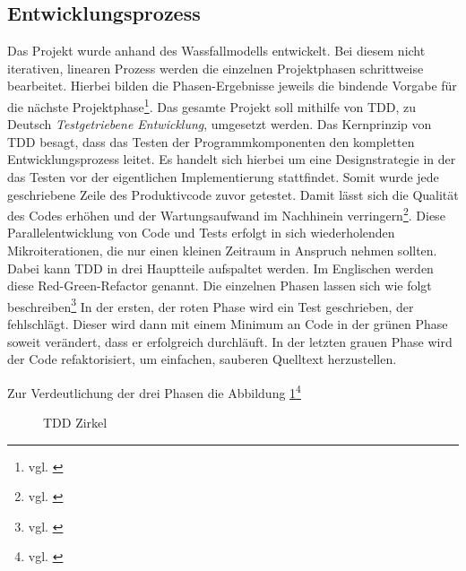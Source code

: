 \subsection{Entwicklungsprozess}
\label{sec:Entwicklungsprozess}
Das Projekt wurde anhand des Wassfallmodells entwickelt.
Bei diesem nicht iterativen, linearen Prozess werden die einzelnen Projektphasen schrittweise bearbeitet. Hierbei bilden die Phasen-Ergebnisse jeweils die bindende Vorgabe für die nächste Projektphase\footnote{vgl. \cite[S. 263]{ItHandbuch}}.
Das gesamte Projekt soll mithilfe von \ac{TDD}, zu Deutsch \textit{Testgetriebene Entwicklung}, umgesetzt werden. Das Kernprinzip von \ac{TDD} besagt, dass das Testen der Programmkomponenten den kompletten Entwicklungsprozess leitet.
Es handelt sich hierbei um eine Designstrategie in der das Testen vor der eigentlichen Implementierung stattfindet. Somit wurde jede geschriebene Zeile des Produktivcode zuvor getestet.
Damit lässt sich die Qualität des Codes erhöhen und der Wartungsaufwand im Nachhinein verringern\footnote{vgl. \cite{datenschutzbeauftragter}}.
Diese Parallelentwicklung von Code und Tests erfolgt in sich wiederholenden Mikroiterationen, die nur einen kleinen Zeitraum in Anspruch nehmen sollten. Dabei kann \acs{TDD} in drei Hauptteile aufspaltet werden. Im Englischen werden diese Red-Green-Refactor genannt. 
Die einzelnen Phasen lassen sich wie folgt beschreiben\footnote{vgl. \cite{tddwiki}}
In der ersten, der roten Phase wird ein Test geschrieben, der fehlschlägt. Dieser wird dann mit einem Minimum an Code in der grünen Phase soweit verändert, dass er erfolgreich durchläuft. In der letzten grauen Phase wird der Code refaktorisiert, um einfachen, sauberen Quelltext herzustellen. 

Zur Verdeutlichung der drei Phasen die Abbildung \ref{fig:tddcircle}\footnote{vgl. \cite{tddcircle}}
\begin{figure}[htb!]
\centering
{}
\caption{TDD Zirkel}
\label{fig:tddcircle}%
\end{figure}